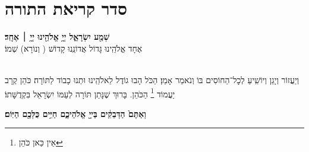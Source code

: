 \vspace{0.5in}
\chapter[סדר קריאת התורה]{ סדר קריאת התורה }
\vspace{0.2in}
\longpesicha


\brikhshmei

\textbf{שְׁמַ֖ע יִשְׂרָאֵ֑ל יְיָ֥ אֱלֹהֵ֖ינוּ יְיָ֥ ׀ אֶחָֽד׃}\\

אֶחָד אֱלֹהֵֽינוּ גָּדוֹל אֲדוֹנֵֽנוּ קָדוֹשׁ ( וְנוֹרָא) שְׁמוֹ׃

\gadlu

\label{al hakol}

\avharachamim

\\
וְיַעֲזוֹר וְיָגֵן וְיוֹשִֽׁיעַ לְכׇל־הַחוֹסִים בּוֹ וְנֹאמַר אָמֵן׃
הַכֹּל הָבוּ גוֹדֶל לֵאלֹהֵֽינוּ וּתְנוּ כָבוֹד לַתּוֹרָה׃ כֹּהֵן קְרָב יַעֲמוֹד
\footnote{ אֵין כַּאן כֹּהֵן}
הַכֹּהֵן. בָּרוּךְ שֶׁנָּתַן תּוֹרָה לְעַמּוֹ יִשְׂרָאֵל בִּקְדֻשָּׁתוֹ׃

\textbf{וְאַתֶּם֙ הַדְּבֵקִ֔ים בַּייָ֖ אֱלֹהֵיכֶ֑ם חַיִּ֥ים כֻּלְּכֶ֖ם הַיּֽוֹם׃} 

